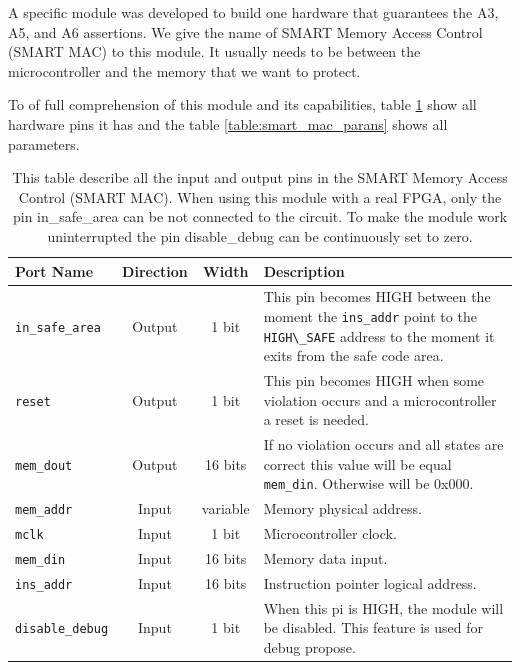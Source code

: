 A specific module was developed to build one hardware that guarantees the A3, A5, and A6 assertions. We give the name of SMART Memory Access Control (SMART MAC) to this module. It usually needs to be between the microcontroller and the memory that we want to protect.

To of full comprehension of this module and its capabilities, table \ref{table:smart_mac_pins} show all hardware pins it has and the table \ref{table:smart_mac_parans} shows all parameters.

\begin{table}
	\begin{center}
		\begin{tabular}{|l|c|c|@{}m{8.5cm}@{}|}
			\hline 
			\textbf{Port Name} & \textbf{Direction}& \textbf{Width}& \textbf{Description} \\
			\hline 
			\verb|in_safe_area| & Output& 1 bit& This pin becomes HIGH between the moment the \verb|ins_addr| point to the \verb|HIGH\_SAFE| address to the moment it exits from the safe code area.  \\
			\hline 
			\verb|reset| & Output& 1 bit& This pin becomes HIGH when some violation occurs and a microcontroller a reset is needed. \\
			\hline 
			\verb|mem_dout| & Output& 16 bits& If no violation occurs and all states are correct this value will be equal \verb|mem_din|. Otherwise will be 0x000. \\
			
			\hline 
			\verb|mem_addr| & Input& variable & Memory physical address. \\
			\hline 
			\verb|mclk| & Input& 1 bit& Microcontroller clock. \\
			\hline 
			\verb|mem_din| & Input& 16 bits& Memory data input. \\
			\hline 
			\verb|ins_addr| & Input& 16 bits& Instruction pointer logical address. \\
			\hline 
			\verb|disable_debug| & Input& 1 bit& When this pi is HIGH, the module will be disabled. This feature is used for debug propose. \\ 
			\hline
		\end{tabular}
	\end{center}
	\caption{This table describe all the input and output pins in the SMART Memory Access Control (SMART MAC). When using this module with a real FPGA, only the pin in\_safe\_area can be not connected to the circuit. To make the module work uninterrupted the pin disable\_debug can be continuously set to zero.}
	\label{table:smart_mac_pins}
\end{table}

